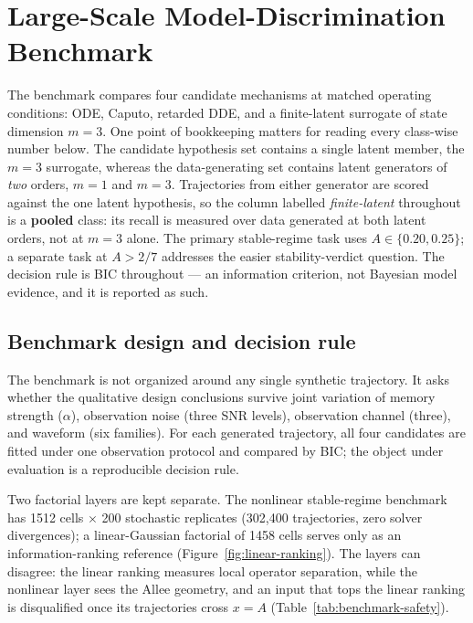 \section{Large-Scale Model-Discrimination Benchmark}
\label{sec:benchmark}

The benchmark compares four candidate mechanisms at matched operating conditions: ODE, Caputo, retarded DDE, and a finite-latent surrogate of state dimension $m=3$. One point of bookkeeping matters for reading every class-wise number below. The candidate hypothesis set contains a single latent member, the $m=3$ surrogate, whereas the data-generating set contains latent generators of \emph{two} orders, $m=1$ and $m=3$. Trajectories from either generator are scored against the one latent hypothesis, so the column labelled \emph{finite-latent} throughout is a \textbf{pooled} class: its recall is measured over data generated at both latent orders, not at $m=3$ alone. The primary stable-regime task uses $A\in\{0.20,0.25\}$; a separate task at $A>2/7$ addresses the easier stability-verdict question. The decision rule is BIC throughout --- an information criterion, not Bayesian model evidence, and it is reported as such.

\subsection{Benchmark design and decision rule}
The benchmark is not organized around any single synthetic trajectory. It asks whether the qualitative design conclusions survive joint variation of memory strength ($\alpha$), observation noise (three SNR levels), observation channel (three), and waveform (six families). For each generated trajectory, all four candidates are fitted under one observation protocol and compared by BIC; the object under evaluation is a reproducible decision rule.

Two factorial layers are kept separate. The nonlinear stable-regime benchmark has 1512 cells $\times$ 200 stochastic replicates (302{,}400 trajectories, zero solver divergences); a linear-Gaussian factorial of 1458 cells serves only as an information-ranking reference (Figure~\ref{fig:linear-ranking}). The layers can disagree: the linear ranking measures local operator separation, while the nonlinear layer sees the Allee geometry, and an input that tops the linear ranking is disqualified once its trajectories cross $x=A$ (Table~\ref{tab:benchmark-safety}).

